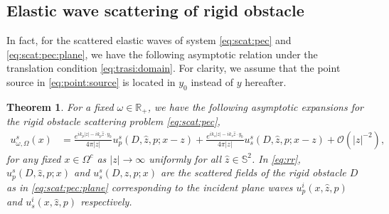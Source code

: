 \documentclass[a4paper,11pt]{article}
\newtheorem{theorem}{Theorem}[section]
\theoremstyle{remark}
\theoremstyle{definition}
\numberwithin{equation}{section}
\begin{document}
\subsection{Elastic wave scattering of rigid obstacle}


In fact, for the scattered elastic waves of system \eqref{eq:scat:pec} and \eqref{eq:scat:pec:plane}, we have the following asymptotic relation under the translation condition \eqref{eq:trasi:domain}. For clarity, we assume that the point source in \eqref{eq:point:source} is located in $y_0$ instead of $y$ hereafter.
 \begin{theorem}\label{thm:pec}
For a fixed $\omega \in \mathbb{R}_{+}$, we have the following asymptotic expansions for the rigid obstacle scattering problem \eqref{eq:scat:pec},
 \begin{align}\label{eq:rr}
 u_{\omega,\Omega}^s(x)
 & =\frac{e^{ik_p|z|-ik_p\hat{z} \cdot y_0}}{4 \pi |z|}u_{p}^s(D,\hat{z},p;x-z)+ \frac{e^{ik_s|z|-ik_s\hat{z} \cdot y_0}}{4 \pi |z|}u_{s}^s(D,\hat{z},p;x-z)+ \mathcal{O}(|z|^{-2}),
 \end{align}
 for any fixed $x \in \Omega^c$ as $|z| \rightarrow \infty$ uniformly for all $\hat{z} \in \mathbb{S}^2$.
In \eqref{eq:rr}, $u_{p}^s(D,\hat{z},p;x)$ and $u_{s}^s(D,\hat{z},p;x)$ are the scattered fields of the rigid obstacle $D$ as in \eqref{eq:scat:pec:plane} corresponding to the incident plane waves
  $u_{p}^i(x,\hat{z},p)$ and $u_{s}^i(x,\hat{z},p)$ respectively.
 \end{theorem}
\end{document}
